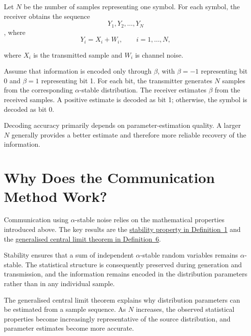 \documentclass[a4paper, 12pt, openany]{book}
\begin{document}
\begin{tcolorbox}[colback=blue!5!white,colframe=blue!50!black, title=Definition 8: Theoretical operation of the receiver]
Let $N$ be the number of samples representing one symbol. For each symbol, the receiver obtains the sequence
\[
Y_1,Y_2,\dots,Y_N
\],
where
\[
Y_i = X_i + W_i, \qquad i=1,\ldots,N,
\]

where $X_i$ is the transmitted sample and $W_i$ is channel noise.
\end{tcolorbox}

\begin{tcolorbox}[colback=purple!5!white,colframe=purple!50!black,
title=Communication example]
\label{komunikacija_primer}
Assume that information is encoded only through $\beta$, with $\beta=-1$ representing bit 0 and $\beta=1$ representing bit 1. For each bit, the transmitter generates $N$ samples from the corresponding $\alpha$-stable distribution. The receiver estimates $\beta$ from the received samples. A positive estimate is decoded as bit 1; otherwise, the symbol is decoded as bit 0.

\end{tcolorbox}


Decoding accuracy primarily depends on parameter-estimation quality. A larger $N$ generally provides a better estimate and therefore more reliable recovery of the information.

\section{Why Does the Communication Method Work?}

Communication using $\alpha$-stable noise relies on the mathematical properties introduced above. The key results are the \hyperref[def:stable]{stability property in Definition~1} and the \hyperref[def:GCLI]{generalised central limit theorem in Definition~6}.

Stability ensures that a sum of independent $\alpha$-stable random variables remains $\alpha$-stable. The statistical structure is consequently preserved during generation and transmission, and the information remains encoded in the distribution parameters rather than in any individual sample.

The generalised central limit theorem explains why distribution parameters can be estimated from a sample sequence. As $N$ increases, the observed statistical properties become increasingly representative of the source distribution, and parameter estimates become more accurate.
\end{document}
